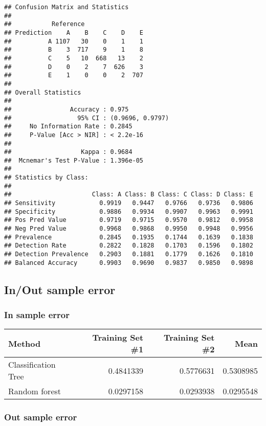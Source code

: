 \documentclass[]{article}
\begin{document}
\begin{verbatim}
## Confusion Matrix and Statistics
## 
##           Reference
## Prediction    A    B    C    D    E
##          A 1107   30    0    1    1
##          B    3  717    9    1    8
##          C    5   10  668   13    2
##          D    0    2    7  626    3
##          E    1    0    0    2  707
## 
## Overall Statistics
##                                           
##                Accuracy : 0.975           
##                  95% CI : (0.9696, 0.9797)
##     No Information Rate : 0.2845          
##     P-Value [Acc > NIR] : < 2.2e-16       
##                                           
##                   Kappa : 0.9684          
##  Mcnemar's Test P-Value : 1.396e-05       
## 
## Statistics by Class:
## 
##                      Class: A Class: B Class: C Class: D Class: E
## Sensitivity            0.9919   0.9447   0.9766   0.9736   0.9806
## Specificity            0.9886   0.9934   0.9907   0.9963   0.9991
## Pos Pred Value         0.9719   0.9715   0.9570   0.9812   0.9958
## Neg Pred Value         0.9968   0.9868   0.9950   0.9948   0.9956
## Prevalence             0.2845   0.1935   0.1744   0.1639   0.1838
## Detection Rate         0.2822   0.1828   0.1703   0.1596   0.1802
## Detection Prevalence   0.2903   0.1881   0.1779   0.1626   0.1810
## Balanced Accuracy      0.9903   0.9690   0.9837   0.9850   0.9898
\end{verbatim}

\subsection{In/Out sample error}\label{inout-sample-error}

\subsubsection{In sample error}\label{in-sample-error}

\begin{longtable}[c]{@{}lrrr@{}}
\toprule
Method & Training Set \#1 & Training Set \#2 & Mean\tabularnewline
\midrule
\endhead
Classification Tree & 0.4841339 & 0.5776631 & 0.5308985\tabularnewline
Random forest & 0.0297158 & 0.0293938 & 0.0295548\tabularnewline
\bottomrule
\end{longtable}

\subsubsection{Out sample error}\label{out-sample-error}
\end{document}
